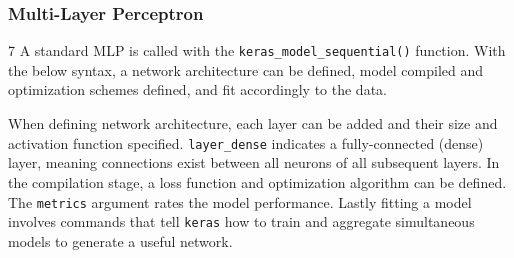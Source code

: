 
\subsubsection{Multi-Layer Perceptron}

7
A standard MLP is called with the \texttt{keras\_model\_sequential()}
function. With the below syntax, a network architecture can be defined,
model compiled and optimization schemes defined, and fit accordingly to
the data.

\begin{Shaded}
\begin{Highlighting}[]
\OtherTok{\textless{}{-}} \NormalTok{()           }
\SpecialCharTok{\%\textgreater{}\%}
      \NormalTok{(} \NormalTok{, } \NormalTok{, } \NormalTok{(}\NormalTok{)) }\SpecialCharTok{\%\textgreater{}\%}
      \NormalTok{(} \NormalTok{, } \NormalTok{) }\SpecialCharTok{\%\textgreater{}\%} 
          \NormalTok{(} \NormalTok{,      }
           \NormalTok{,}
           \NormalTok{) }\SpecialCharTok{\%\textgreater{}\%} 
               \NormalTok{,}
               \NormalTok{,}
               \NormalTok{)}
\end{Highlighting}
\end{Shaded}

When defining network architecture, each layer can be added and their
size and activation function specified. \texttt{layer\_dense} indicates
a fully-connected (dense) layer, meaning connections exist between all
neurons of all subsequent layers. In the compilation stage, a loss
function and optimization algorithm can be defined. The \texttt{metrics}
argument rates the model performance. Lastly fitting a model involves
commands that tell \texttt{keras} how to train and aggregate
simultaneous models to generate a useful network.



